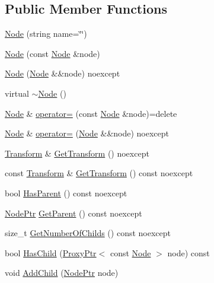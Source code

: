 \subsection*{Public Member Functions}
\begin{DoxyCompactItemize}
\item 
\hyperlink{classmage_1_1_node_a6638b75608b2b340743a0a639230492d}{Node} (string name=\char`\"{}\char`\"{})
\item 
\hyperlink{classmage_1_1_node_af9da591163469f210895f3a5b389d7cc}{Node} (const \hyperlink{classmage_1_1_node}{Node} \&node)
\item 
\hyperlink{classmage_1_1_node_a848ecb05c6b085cb4f27e38add85e64c}{Node} (\hyperlink{classmage_1_1_node}{Node} \&\&node) noexcept
\item 
virtual \hyperlink{classmage_1_1_node_a1369fc11b331abacbaf11aeb5729e871}{$\sim$\+Node} ()
\item 
\hyperlink{classmage_1_1_node}{Node} \& \hyperlink{classmage_1_1_node_ad10ea13608963acfa06d3c1577314da5}{operator=} (const \hyperlink{classmage_1_1_node}{Node} \&node)=delete
\item 
\hyperlink{classmage_1_1_node}{Node} \& \hyperlink{classmage_1_1_node_a10d0ed7f0ade94ce7cbd6f413ae82757}{operator=} (\hyperlink{classmage_1_1_node}{Node} \&\&node) noexcept
\item 
\hyperlink{classmage_1_1_transform}{Transform} \& \hyperlink{classmage_1_1_node_ad087f43f468552c7d4e2a4ea605b0220}{Get\+Transform} () noexcept
\item 
const \hyperlink{classmage_1_1_transform}{Transform} \& \hyperlink{classmage_1_1_node_aa8e2a3e9361dbdb4be23a8986f4ef082}{Get\+Transform} () const noexcept
\item 
bool \hyperlink{classmage_1_1_node_a2c1fe63ec1cb15321f0b0f5879227dcd}{Has\+Parent} () const noexcept
\item 
\hyperlink{classmage_1_1_node_ac575dc006e0ae1134277ade977dc06b6}{Node\+Ptr} \hyperlink{classmage_1_1_node_add9389d951ae864d7f92261398297089}{Get\+Parent} () const noexcept
\item 
size\+\_\+t \hyperlink{classmage_1_1_node_a975d92d3d93fe00d748c341198ddf02c}{Get\+Number\+Of\+Childs} () const noexcept
\item 
bool \hyperlink{classmage_1_1_node_ab75d538a04736033df80747f16744f3a}{Has\+Child} (\hyperlink{classmage_1_1_proxy_ptr}{Proxy\+Ptr}$<$ const \hyperlink{classmage_1_1_node}{Node} $>$ node) const
\item 
void \hyperlink{classmage_1_1_node_ad2324a1a111548e4b80b8e4cbaba5221}{Add\+Child} (\hyperlink{classmage_1_1_node_ac575dc006e0ae1134277ade977dc06b6}{Node\+Ptr} node)

\end{DoxyCompactItemize}
